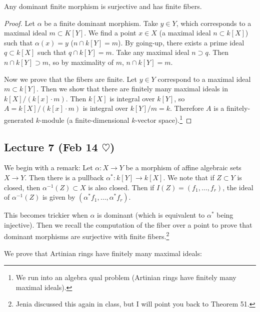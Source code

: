 \documentclass[twoside, 10pt]{article}
\begin{document}
    \begin{thm} Any dominant finite morphism is surjective and has finite
        fibers.  \begin{proof} Let $\alpha$ be a finite dominant morphism. Take
            $y \in Y$, which corresponds to a maximal ideal $m \subset K[Y]$.
            We find a point $x \in X$ (a maximal ideal $n \subset k[X]$) such
            that $\alpha(x) = y$ ($n \cap k[Y] = m$). By going-up, there exists
            a prime ideal $q \subset k[X]$ such that $q \cap k[Y] = m$. Take
            any maximal ideal $n \supset q$. Then $n \cap k[Y] \supset m$, so
            by maximality of $m$, $n \cap k[Y] = m$.

            Now we prove that the fibers are finite. Let $y \in Y$ correspond
            to a maximal ideal $m \subset k[Y]$. Then we show that there are
            finitely many maximal ideals in $k[X]/(k[x]\cdot m)$. Then $k[X]$
            is integral over $k[Y]$, so $A = k[X]/(k[x]\cdot m)$ is integral
            over $k[Y]/m = k$. Therefore $A$ is a finitely-generated $k$-module
            (a finite-dimensional $k$-vector space).\footnote{We run into an
                algebra qual problem (Artinian rings have finitely many maximal
        ideals).} \end{proof} \end{thm}

    \subsection{Lecture 7 (Feb 14 $\heartsuit$)}

    We begin with a remark: Let $\alpha: X \rightarrow Y$ be a morphism of
    affine algebraic sets $X \rightarrow Y$. Then there is a pullback
    $\alpha^*: k[Y] \rightarrow k[X]$. We note that if $Z \subset Y$ is closed,
    then $\alpha^{-1}(Z) \subset X$ is also closed. Then if $I(Z) = (f_1,
    \ldots, f_r)$, the ideal of $\alpha^{-1}(Z)$ is given by $(\alpha^*f_1,
    \ldots, \alpha^*f_r)$.

    This becomes trickier when $\alpha$ is dominant (which is equivalent to
    $\alpha^*$ being injective). Then we recall the computation of the fiber
    over a point to prove that dominant morphisms are surjective with finite
    fibers.\footnote{Jenia discussed this again in class, but I will point you
    back to Theorem 51.}

    We prove that Artinian rings have finitely many maximal ideals:
\end{document}
